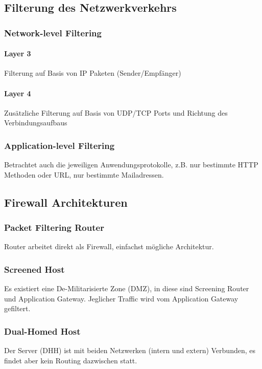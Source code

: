 \subsection{Filterung des Netzwerkverkehrs}
\subsubsection{Network-level Filtering}
\paragraph{Layer 3}
Filterung auf Basis von IP Paketen (Sender/Empfänger)

\paragraph{Layer 4}
Zusätzliche Filterung auf Basis von UDP/TCP Ports und Richtung des Verbindungsaufbaus

\subsubsection{Application-level Filtering}
Betrachtet auch die jeweiligen Anwendungsprotokolle, z.B. nur bestimmte HTTP Methoden oder URL, nur bestimmte Mailadressen.

\subsection{Firewall Architekturen}
\subsubsection{Packet Filtering Router}
Router arbeitet direkt als Firewall, einfachst mögliche Architektur.

\subsubsection{Screened Host}
Es existiert eine De-Militarisierte Zone (DMZ), in diese sind Screening Router und Application Gateway. Jeglicher Traffic wird vom Application Gateway gefiltert.

\subsubsection{Dual-Homed Host}
Der Server (DHH) ist mit beiden Netzwerken (intern und extern) Verbunden, es findet aber kein Routing dazwischen statt.

